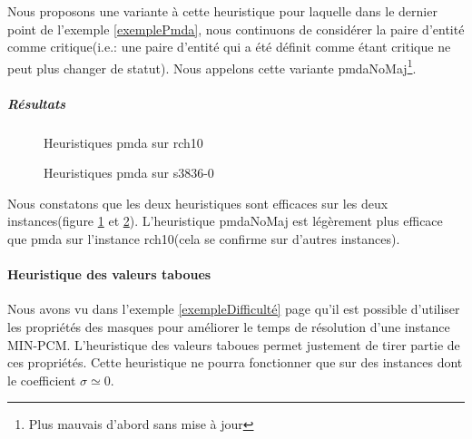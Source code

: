 Nous proposons une variante à cette heuristique pour laquelle dans le dernier point de l'exemple \ref{exemplePmda}, nous continuons de considérer la paire d'entité comme critique(i.e.: une paire d'entité qui a été définit comme étant critique ne peut plus changer de statut). Nous appelons cette variante pmdaNoMaj\footnote{Plus mauvais d'abord sans mise à jour}.

\subparagraph{Résultats}
\begin{figure}
\centering
	\begin{minipage}[c]{0.49\linewidth}
	\centering
	
	\end{minipage}
	\begin{minipage}[c]{0.49\linewidth}
	\centering
	
	\end{minipage}
\caption{Heuristiques pmda sur rch10}
\label{pmdaRch10}
\end{figure}

\begin{figure}
\centering
	\begin{minipage}[c]{0.49\linewidth}
	\centering
	
	\end{minipage}
	\begin{minipage}[c]{0.49\linewidth}
	\centering
	
	\end{minipage}
\caption{Heuristiques pmda sur s3836-0}
\label{pmdaS3836}
\end{figure}

Nous constatons que les deux heuristiques sont efficaces sur les deux instances(figure \ref{pmdaRch10} et \ref{pmdaS3836}). L'heuristique pmdaNoMaj est légèrement plus efficace que pmda sur l'instance rch10(cela se confirme sur d'autres instances).

\paragraph{Heuristique des valeurs taboues}
\label{heuristiqueTabou}

Nous avons vu dans l'exemple \ref{exempleDifficulté} page \pageref{exempleDifficulté} qu'il est possible d'utiliser les propriétés des masques pour améliorer le temps de résolution d'une instance MIN-PCM. L'heuristique des valeurs taboues permet justement de tirer partie de ces propriétés. Cette heuristique ne pourra fonctionner que sur des instances dont le coefficient $\sigma \simeq 0$.

